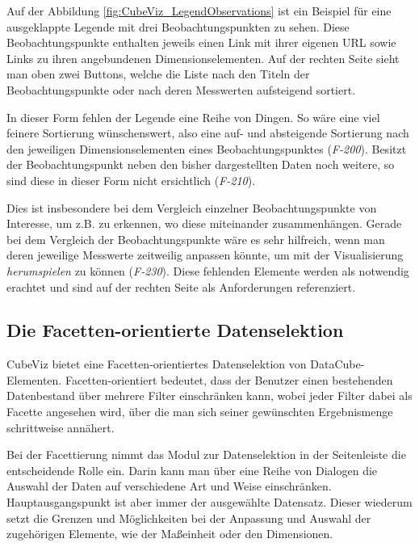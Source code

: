 \documentclass[11pt]{article}
\newcommand{\com}[1]{\marginpar{\em {\small{#1}}}} %
\begin{document}
\newpage
\noindent
Auf der Abbildung \ref{fig:CubeViz_LegendObservations} ist ein Beispiel für eine ausgeklappte Legende mit drei Beobachtungspunkten zu sehen. Diese Beobachtungspunkte enthalten jeweils einen Link mit ihrer eigenen URL sowie Links zu ihren angebundenen Dimensionselementen. Auf der rechten Seite sieht man oben zwei Buttons, welche die Liste nach den Titeln der Beobachtungspunkte oder nach deren Messwerten aufsteigend sortiert.

In dieser Form fehlen der Legende eine Reihe von Dingen. \com{Anforderungen} So wäre eine viel feinere Sortierung wünschenswert, also eine auf- und absteigende Sortierung nach den jeweiligen Dimensionselementen eines Beobachtungspunktes (\textit{F-200})\label{req:F200source}\com{F-200, S. \pageref{req:F200}}. Besitzt der Beobachtungspunkt neben den bisher dargestellten Daten noch weitere, so sind diese in dieser Form nicht ersichtlich (\textit{F-210})\label{req:F210source}.\com{F-210, S. \pageref{req:F210}} 

Dies ist insbesondere bei dem Vergleich einzelner Beobachtungspunkte von Interesse, um z.B. zu erkennen, wo diese miteinander zusammenhängen. Gerade bei dem Vergleich der Beobachtungspunkte wäre es sehr hilfreich, wenn man deren jeweilige Messwerte\com{Anforderung \\ F-230, S. \pageref{req:F230}} zeitweilig anpassen könnte, um mit der Visualisierung \emph{herumspielen} zu können (\textit{F-230})\label{req:F230source}. Diese fehlenden Elemente werden als notwendig erachtet und sind auf der rechten Seite als Anforderungen referenziert.

%
%
\subsection{Die Facetten-orientierte Datenselektion}
\label{sec:chapterCVFacetedDataSel}

CubeViz bietet eine Facetten-orientiertes Datenselektion von DataCube-Elementen. Facetten-orientiert bedeutet, dass der Benutzer einen bestehenden Datenbestand über mehrere Filter einschränken kann, wobei jeder Filter dabei als Facette angesehen wird, über die man sich seiner gewünschten Ergebnismenge schrittweise annähert.\cite[S. 33]{FACETED-SEARCH}

\newpage
\noindent
Bei der Facettierung nimmt das Modul zur Datenselektion in der Seitenleiste die entscheidende Rolle ein. Darin kann man über eine Reihe von Dialogen die Auswahl der Daten auf verschiedene Art und Weise einschränken. Hauptausgangspunkt ist aber immer der ausgewählte Datensatz. Dieser wiederum setzt die Grenzen und Möglichkeiten bei der Anpassung und Auswahl der zugehörigen Elemente, wie der Maßeinheit oder den Dimensionen.
\end{document}
